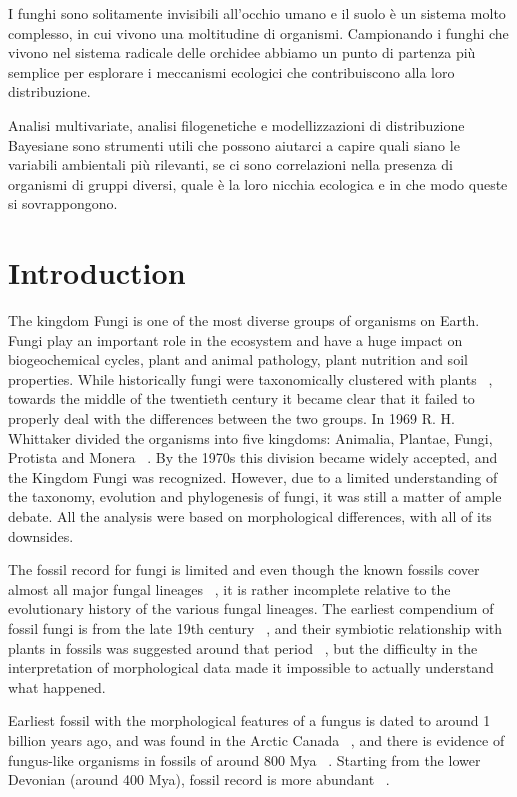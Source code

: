 I funghi sono solitamente invisibili all'occhio umano e il suolo è un sistema molto complesso, in cui vivono una moltitudine di organismi. Campionando i funghi che vivono nel sistema radicale delle orchidee abbiamo un punto di partenza più semplice per esplorare i meccanismi ecologici che contribuiscono alla loro distribuzione.

Analisi multivariate, analisi filogenetiche e modellizzazioni di distribuzione Bayesiane sono strumenti utili che possono aiutarci a capire quali siano le variabili ambientali più rilevanti, se ci sono correlazioni nella presenza di organismi di gruppi diversi, quale è la loro nicchia ecologica e in che modo queste si sovrappongono.

\part{Introduction}
\label{introduction}

The kingdom Fungi is one of the most diverse groups of organisms on Earth. Fungi play an important role in the ecosystem and have a huge impact on biogeochemical cycles, plant and animal pathology, plant nutrition and soil properties.
While historically fungi were taxonomically clustered with plants ~\citep{copeland1938, copeland1956}, towards the middle of the twentieth century it became clear that it failed to properly deal with the differences between the two groups. In 1969 R. H. Whittaker divided the organisms into five kingdoms: Animalia, Plantae, Fungi, Protista and Monera ~\citep{whittaker1969}. By the 1970s this division became widely accepted, and the Kingdom Fungi was recognized.
However, due to a limited understanding of the taxonomy, evolution and phylogenesis of fungi, it was still a matter of ample debate. All the analysis were based on morphological differences, with all of its downsides.

The fossil record for fungi is limited and even though the known fossils cover almost all major fungal lineages ~\citep{lucking2009}, it is rather incomplete relative to the evolutionary history of the various fungal lineages. The earliest compendium of fossil fungi is from the late 19th century ~\citep{meschinelli1898}, and their symbiotic relationship with plants in fossils was suggested around that period ~\citep{renault1896}, but the difficulty in the interpretation of morphological data made it impossible to actually understand what happened.

Earliest fossil with the morphological features of a fungus is dated to around 1 billion years ago, and was found in the Arctic Canada ~\citep{loron2019}, and there is evidence of fungus-like organisms in fossils of around 800 Mya ~\citep{bonneville2020}.
Starting from the lower Devonian (around 400 Mya), fossil record is more abundant ~\citep{lucking2009}.

